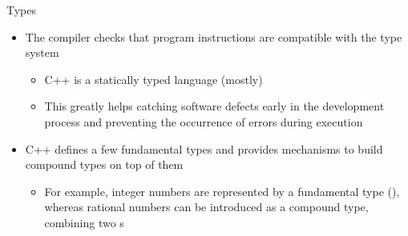\begin{frame}{Types \insertcontinuationtext}

  \begin{itemize}[<+->]
  \item The compiler checks that program instructions are compatible with the type system
    \begin{itemize}
    \item C++ is a \alert{statically typed} language (mostly)
    \item This greatly helps catching software defects early in the development
      process and preventing the occurrence of errors during execution
    \end{itemize}
  \item C++ defines a few fundamental types and provides mechanisms to build
    compound types on top of them
    \begin{itemize}
    \item For example, integer numbers are represented by a fundamental type
      (), whereas rational numbers can be introduced as a compound
      type, combining two s
    \end{itemize}
  \end{itemize}

\end{frame}

